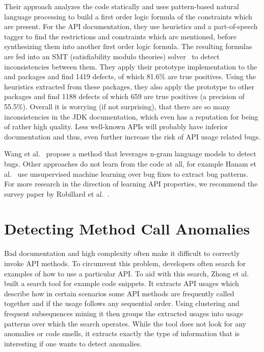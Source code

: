 Their approach analyzes the code statically and uses pattern-based natural language processing to build a first order logic formula of the constraints which are present.
For the API documentation, they use heuristics and a part-of-speech tagger to find the restrictions and constraints which are mentioned, before synthesizing them into another first order logic formula.
The resulting formulas are fed into an SMT (satisfiability modulo theories) solver~\cite{barrett2009satisfiability} to detect inconsistencies between them.
They apply their prototype implementation to the  and  packages and find 1419 defects, of which 81.6\% are true positives.
Using the heuristics extracted from these packages, they also apply the prototype to other packages and find 1188 defects of which 659 are true positives (a precision of 55.5\%).
Overall it is worrying (if not surprising), that there are so many inconsistencies in the JDK documentation, which even has a reputation for being of rather high quality.
Less well-known APIs will probably have inferior documentation and thus, even further increase the risk of API usage related bugs.

Wang et al.~\cite{wang2016bugram} propose a method that leverages n-gram language models to detect bugs.
Other approaches do not learn from the code at all, for example Hanam et al.~\cite{hanam2016discovering} use unsupervised machine learning over bug fixes to extract bug patterns.
For more research in the direction of learning API properties, we recommend the survey paper by Robillard et al.~\cite{robillard2013automated}.

\section{Detecting Method Call Anomalies}

Bad documentation and high complexity often make it difficult to correctly invoke API methods.
To circumvent this problem, developers often search for examples of how to use a particular API\@.
To aid with this search, Zhong et al.~\cite{zhong2009mapo} built a search tool for example code snippets.
It extracts API usages which describe how in certain scenarios some API methods are frequently called together and if the usage follows any sequential order.
Using clustering and frequent subsequences mining it then groups the extracted usages into usage patterns over which the search operates.
While the tool does not look for any anomalies or code smells, it extracts exactly the type of information that is interesting if one wants to detect anomalies.

